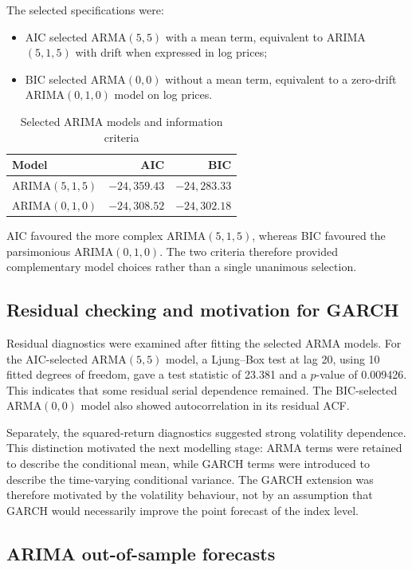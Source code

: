 \documentclass[10pt,a4paper]{article}
\begin{document}
The selected specifications were:
\begin{itemize}[leftmargin=2em]
  \item AIC selected ARMA$(5,5)$ with a mean term, equivalent to ARIMA$(5,1,5)$ with drift when expressed in log prices;
  \item BIC selected ARMA$(0,0)$ without a mean term, equivalent to a zero-drift ARIMA$(0,1,0)$ model on log prices.
\end{itemize}

\begin{table}[H]
\centering
\caption{Selected ARIMA models and information criteria}
\begin{tabular}{lrr}
\toprule
Model & AIC & BIC \\
\midrule
ARIMA$(5,1,5)$ & $-24{,}359.43$ & $-24{,}283.33$ \\
ARIMA$(0,1,0)$ & $-24{,}308.52$ & $-24{,}302.18$ \\
\bottomrule
\end{tabular}
\label{tab:arima_ic}
\end{table}

AIC favoured the more complex ARIMA$(5,1,5)$, whereas BIC favoured the parsimonious ARIMA$(0,1,0)$. The two criteria therefore provided complementary model choices rather than a single unanimous selection.

\subsection{Residual checking and motivation for GARCH}

Residual diagnostics were examined after fitting the selected ARMA models. For the AIC-selected ARMA$(5,5)$ model, a Ljung--Box test at lag 20, using 10 fitted degrees of freedom, gave a test statistic of 23.381 and a $p$-value of 0.009426. This indicates that some residual serial dependence remained. The BIC-selected ARMA$(0,0)$ model also showed autocorrelation in its residual ACF.

Separately, the squared-return diagnostics suggested strong volatility dependence. This distinction motivated the next modelling stage: ARMA terms were retained to describe the conditional mean, while GARCH terms were introduced to describe the time-varying conditional variance. The GARCH extension was therefore motivated by the volatility behaviour, not by an assumption that GARCH would necessarily improve the point forecast of the index level.

\subsection{ARIMA out-of-sample forecasts}
\end{document}
